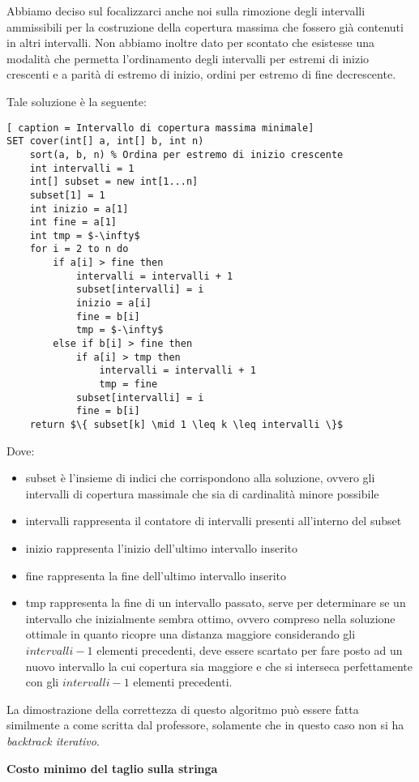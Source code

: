 \documentclass[../cheatSheetAlgoritmi.tex]{subfiles}
\begin{document}
Abbiamo deciso sul focalizzarci anche noi sulla rimozione degli intervalli ammissibili per la \hfill \break costruzione della copertura massima che fossero già contenuti in altri intervalli. Non abbiamo inoltre dato per scontato che esistesse una modalità che permetta l'ordinamento degli intervalli per estremi di inizio crescenti e a parità di estremo di inizio, ordini per estremo di fine decrescente. 

Tale soluzione è la seguente:
\begin{lstlisting}[ caption = Intervallo di copertura massima minimale]
SET cover(int[] a, int[] b, int n)
	sort(a, b, n) % Ordina per estremo di inizio crescente
	int intervalli = 1
	int[] subset = new int[1...n]
	subset[1] = 1
	int inizio = a[1]
	int fine = a[1]
	int tmp = $-\infty$
	for i = 2 to n do
		if a[i] > fine then
			intervalli = intervalli + 1
			subset[intervalli] = i
			inizio = a[i]
			fine = b[i]
			tmp = $-\infty$
		else if b[i] > fine then
			if a[i] > tmp then
				intervalli = intervalli + 1
				tmp = fine
			subset[intervalli] = i
			fine = b[i]
	return $\{ subset[k] \mid 1 \leq k \leq intervalli \}$ 
\end{lstlisting}
Dove:
\begin{itemize}
	\item subset è l'insieme di indici che corrispondono alla soluzione, ovvero gli intervalli di copertura massimale che sia di cardinalità minore possibile
	\item intervalli rappresenta il contatore di intervalli presenti all'interno del subset
	\item inizio rappresenta l'inizio dell'ultimo intervallo inserito
	\item fine rappresenta la fine dell'ultimo intervallo inserito
	\item tmp rappresenta la fine di un intervallo passato, serve per determinare se un intervallo che inizialmente sembra ottimo, ovvero compreso nella soluzione ottimale in quanto ricopre una distanza maggiore considerando gli $intervalli - 1$ elementi precedenti, deve essere scartato per fare posto ad un nuovo intervallo la cui copertura sia maggiore e che si interseca perfettamente con gli $intervalli - 1$ elementi precedenti.
\end{itemize}
La dimostrazione della correttezza di questo algoritmo può essere fatta similmente a come scritta dal professore, solamente che in questo caso non si ha \emph{backtrack iterativo}.

\bigskip

\textbf{Costo minimo del taglio sulla stringa} 
\end{document}
